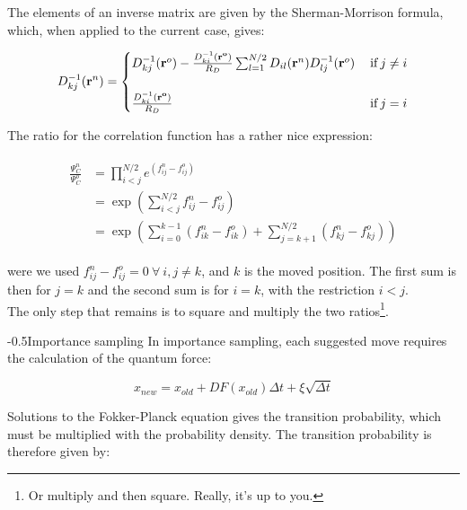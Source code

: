 \documentclass[english, a4paper]{article}
\makeatletter
\renewcommand{\subsubsection}{\@startsection{subsubsection}{3}{0pt}%
{-\baselineskip}{0.5\baselineskip}{\bf\large}}
\newcommand{\bm}[1]{\mathbf{#1}}
\makeatother
\begin{document}
The elements of an inverse matrix are given by the Sherman-Morrison formula, which, when applied to the current case, gives:

\begin{equation}
D_{kj}^{-1}(\bm{r}^n) =
\begin{cases}
D_{kj}^{-1}(\bm{r}^o) - \frac{D_{ki}^{-1}(\bm{r^o})}{R_D}\sum_{l=1}^{N/2}D_{il}(\bm{r}^n)D_{lj}^{-1}(\bm{r}^o) \:&\text{if}\: j\neq i\\ \vspace{1pt}\\
\frac{D_{ki}^{-1}(\bm{r^o})}{R_D} \:&\text{if}\: j = i \\
\end{cases}
\label{eq:update_inverse_SD}
\end{equation}

The ratio for the correlation function has a rather nice expression:

\begin{align}
	\begin{split}
	\frac{\Psi_C^n}{\Psi_C^o} &= \prod_{i<j}^{N/2} e^{(f_{ij}^n-f_{ij}^o)}\\
	&= \exp\left( \sum_{i<j}^{N/2} f_{ij}^n - f_{ij}^o \right)\\
	&= \exp\left(\sum_{i=0}^{k-1}(f_{ik}^n - f_{ik}^o) + \sum_{j=k+1}^{N/2}(f_{kj}^n - f_{kj}^o)\right)
	\end{split}
\end{align}

were we used $f_{ij}^n-f_{ij}^o=0\:\forall\:i,j\neq k$, and $k$ is the moved position. The first sum is then for $j=k$ and the second sum is for $i=k$, with the restriction $i<j$.\\
The only step that remains is to square and multiply the two ratios\footnote{Or multiply and then square. Really, it's up to you.}.

\subsubsection{Importance sampling}
In importance sampling, each suggested move requires the calculation of the quantum force:

\begin{equation}
	x_{new} = x_{old} + DF(x_{old})\Delta t + \xi\sqrt{\Delta t}
\end{equation}

Solutions to the Fokker-Planck equation gives the transition probability, which must be multiplied with the probability density. The transition probability is therefore given by:
\end{document}
